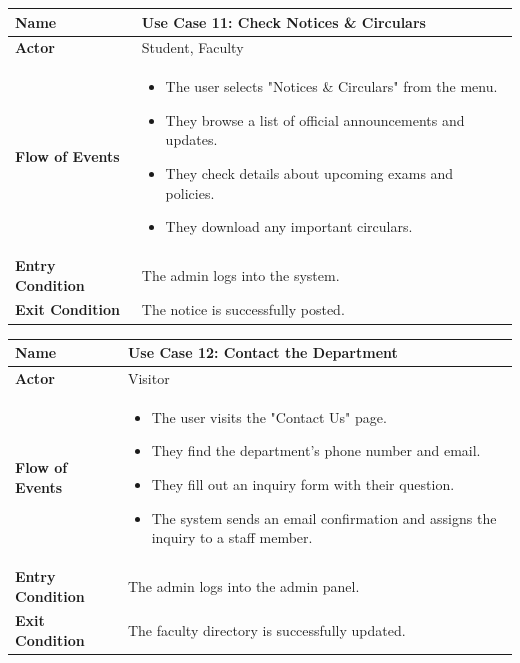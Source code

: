 \documentclass[11pt]{article}
\begin{document}
\begin{center}
\begin{tabular}{ | >{\bfseries}m{6em} | m{10cm} | }
  \hline
  \textbf{Name} & Use Case 11: Check Notices \& Circulars \\
  \hline
  \textbf{Actor} & Student, Faculty \\
  \hline
  \textbf{Flow of Events} & 
  \begin{itemize}
      \item The user selects "Notices \& Circulars" from the menu.
      \item They browse a list of official announcements and updates.
      \item They check details about upcoming exams and policies.
      \item They download any important circulars.
  \end{itemize} \\
  \hline
  \textbf{Entry Condition} & The admin logs into the system. \\
  \hline
  \textbf{Exit Condition} & The notice is successfully posted. \\
  \hline
\end{tabular}
\end{center}

\begin{center}
\begin{tabular}{ | >{\bfseries}m{6em} | m{10cm} | }
  \hline
  \textbf{Name} & Use Case 12: Contact the Department \\
  \hline
  \textbf{Actor} & Visitor \\
  \hline
  \textbf{Flow of Events} & 
  \begin{itemize}
      \item The user visits the "Contact Us" page.
      \item They find the department’s phone number and email.
      \item They fill out an inquiry form with their question.
      \item The system sends an email confirmation and assigns the inquiry to a staff member.
  \end{itemize} \\
  \hline
  \textbf{Entry Condition} & The admin logs into the admin panel. \\
  \hline
  \textbf{Exit Condition} & The faculty directory is successfully updated. \\
  \hline
\end{tabular}
\end{center}
\end{document}
